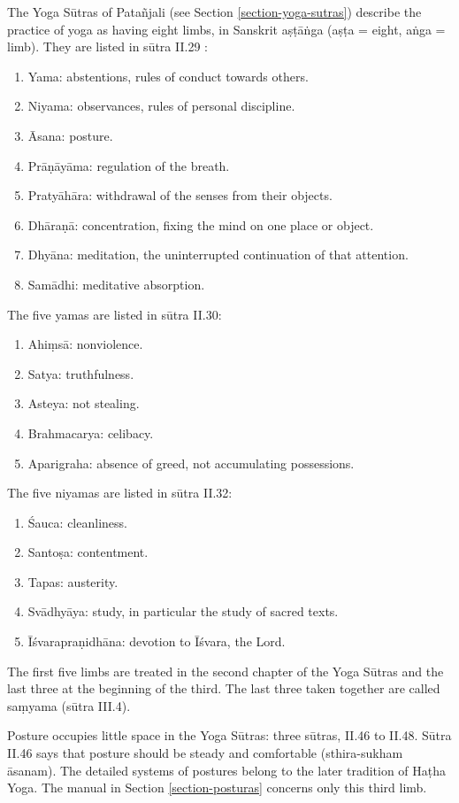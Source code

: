The Yoga Sūtras of Patañjali (see Section
\ref{section-yoga-sutras}) describe the
practice of yoga as having eight limbs, in
Sanskrit aṣṭāṅga (aṣṭa = eight, aṅga = limb).
They are listed in sūtra II.29
\cite{bryant-yoga-sutras}:
\begin{enumerate}
\item Yama: abstentions, rules of conduct
towards others.
\item Niyama: observances, rules of personal
discipline.
\item Āsana: posture.
\item Prāṇāyāma: regulation of the breath.
\item Pratyāhāra: withdrawal of the senses
from their objects.
\item Dhāraṇā: concentration, fixing the mind
on one place or object.
\item Dhyāna: meditation, the uninterrupted
continuation of that attention.
\item Samādhi: meditative absorption.
\end{enumerate}

The five yamas are listed in sūtra II.30:
\begin{enumerate}
\item Ahiṃsā: nonviolence.
\item Satya: truthfulness.
\item Asteya: not stealing.
\item Brahmacarya: celibacy.
\item Aparigraha: absence of greed, not
accumulating possessions.
\end{enumerate}

The five niyamas are listed in sūtra II.32:
\begin{enumerate}
\item Śauca: cleanliness.
\item Santoṣa: contentment.
\item Tapas: austerity.
\item Svādhyāya: study, in particular the
study of sacred texts.
\item Īśvarapraṇidhāna: devotion to Īśvara,
the Lord.
\end{enumerate}

The first five limbs are treated in the
second chapter of the Yoga Sūtras and the
last three at the beginning of the third.
The last three taken together are called
saṃyama (sūtra III.4).

Posture occupies little space in the Yoga
Sūtras: three sūtras, II.46 to II.48. Sūtra
II.46 says that posture should be steady and
comfortable (sthira-sukham āsanam). The
detailed systems of postures belong to the
later tradition of Haṭha Yoga. The manual in
Section \ref{section-posturas} concerns only
this third limb.

